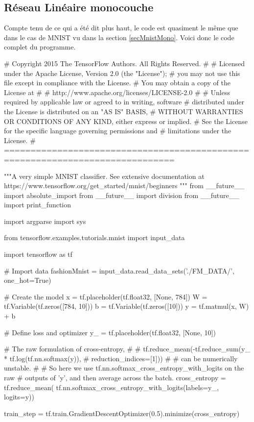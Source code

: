 \documentclass[a4paper,11pt]{book}
\theoremstyle{theo}
\begin{document}
\subsection{Réseau Linéaire monocouche}
\label{secFashionMnistMono}
Compte tenu de ce qui a été dit plus haut, le code est quasiment le même que dans le cas de MNIST vu dans la section \ref{secMnistMono}. 
Voici donc le code complet du programme.
\begin{mypython}
# Copyright 2015 The TensorFlow Authors. All Rights Reserved.
#
# Licensed under the Apache License, Version 2.0 (the "License");
# you may not use this file except in compliance with the License.
# You may obtain a copy of the License at
#
#     http://www.apache.org/licenses/LICENSE-2.0
#
# Unless required by applicable law or agreed to in writing, software
# distributed under the License is distributed on an "AS IS" BASIS,
# WITHOUT WARRANTIES OR CONDITIONS OF ANY KIND, either express or implied.
# See the License for the specific language governing permissions and
# limitations under the License.
# ==============================================================================

"""A very simple MNIST classifier.
See extensive documentation at
https://www.tensorflow.org/get_started/mnist/beginners
"""
from __future__ import absolute_import
from __future__ import division
from __future__ import print_function

import argparse
import sys

from tensorflow.examples.tutorials.mnist import input_data

import tensorflow as tf

# Import data
fashionMnist = input_data.read_data_sets('./FM_DATA/', one_hot=True)

# Create the model
x = tf.placeholder(tf.float32, [None, 784])
W = tf.Variable(tf.zeros([784, 10]))
b = tf.Variable(tf.zeros([10]))
y = tf.matmul(x, W) + b

# Define loss and optimizer
y_ = tf.placeholder(tf.float32, [None, 10])

# The raw formulation of cross-entropy,
#
#   tf.reduce_mean(-tf.reduce_sum(y_ * tf.log(tf.nn.softmax(y)),
#                                 reduction_indices=[1]))
#
# can be numerically unstable.
#
# So here we use tf.nn.softmax_cross_entropy_with_logits on the raw
# outputs of 'y', and then average across the batch.
cross_entropy = tf.reduce_mean(
  tf.nn.softmax_cross_entropy_with_logits(labels=y_, logits=y))

train_step = tf.train.GradientDescentOptimizer(0.5).minimize(cross_entropy)


\end{mypython}
\end{document}
